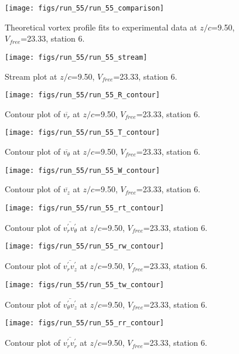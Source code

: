 \begin{figure}[H]
\centering
\texttt{[image: figs/run\_55/run\_55\_comparison]}
\caption{Theoretical vortex profile fits to experimental data at $z/c$=9.50, $V_{free}$=23.33, station 6.}
\end{figure}


\begin{figure}[H]
\centering
\texttt{[image: figs/run\_55/run\_55\_stream]}
\caption{Stream plot at $z/c$=9.50, $V_{free}$=23.33, station 6.}
\end{figure}


\begin{figure}[H]
\centering
\texttt{[image: figs/run\_55/run\_55\_R\_contour]}
\caption{Contour plot of $\overline{v_{r}}$ at $z/c$=9.50, $V_{free}$=23.33, station 6.}
\end{figure}


\begin{figure}[H]
\centering
\texttt{[image: figs/run\_55/run\_55\_T\_contour]}
\caption{Contour plot of $\overline{v_{\theta}}$ at $z/c$=9.50, $V_{free}$=23.33, station 6.}
\end{figure}


\begin{figure}[H]
\centering
\texttt{[image: figs/run\_55/run\_55\_W\_contour]}
\caption{Contour plot of $\overline{v_{z}}$ at $z/c$=9.50, $V_{free}$=23.33, station 6.}
\end{figure}


\begin{figure}[H]
\centering
\texttt{[image: figs/run\_55/run\_55\_rt\_contour]}
\caption{Contour plot of $\overline{v_{r}^{\prime} v_{\theta}^{\prime}}$ at $z/c$=9.50, $V_{free}$=23.33, station 6.}
\end{figure}


\begin{figure}[H]
\centering
\texttt{[image: figs/run\_55/run\_55\_rw\_contour]}
\caption{Contour plot of $\overline{v_{r}^{\prime} v_{z}^{\prime}}$ at $z/c$=9.50, $V_{free}$=23.33, station 6.}
\end{figure}


\begin{figure}[H]
\centering
\texttt{[image: figs/run\_55/run\_55\_tw\_contour]}
\caption{Contour plot of $\overline{v_{\theta}^{\prime} v_{z}^{\prime}}$ at $z/c$=9.50, $V_{free}$=23.33, station 6.}
\end{figure}


\begin{figure}[H]
\centering
\texttt{[image: figs/run\_55/run\_55\_rr\_contour]}
\caption{Contour plot of $\overline{v_{r}^{\prime} v_{r}^{\prime}}$ at $z/c$=9.50, $V_{free}$=23.33, station 6.}
\end{figure}


